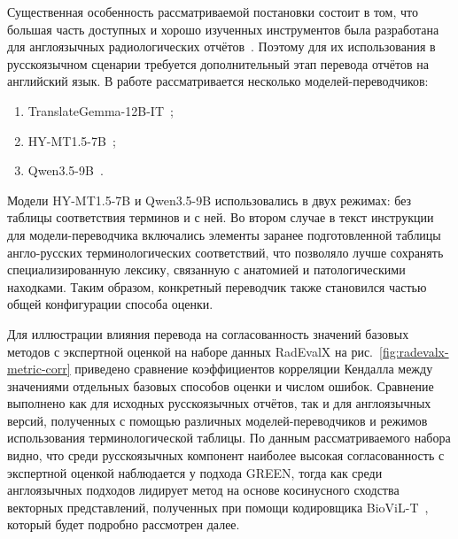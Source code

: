 Существенная особенность рассматриваемой постановки состоит в том, что большая часть доступных и хорошо изученных инструментов была разработана для англоязычных радиологических отчётов~\cite{jain2021radgraph,delbrouck2022semanticrewards,yu2023evaluating,zhao2024ratescore,boecking2022making,bannur2023learning}. Поэтому для их использования в русскоязычном сценарии требуется дополнительный этап перевода отчётов на английский язык. В работе рассматривается несколько моделей-переводчиков:
\begin{enumerate}
    \item TranslateGemma-12B-IT~\cite{translategemma_technical_report};
    \item HY-MT1.5-7B~\cite{hy_mt1_5_technical_report};
    \item Qwen3.5-9B~\cite{qwen3_5_technical_report}.
\end{enumerate}
Модели HY-MT1.5-7B и Qwen3.5-9B использовались в двух режимах: без таблицы соответствия терминов и с ней. Во втором случае в текст инструкции для модели-переводчика включались элементы заранее подготовленной таблицы англо-русских терминологических соответствий, что позволяло лучше сохранять специализированную лексику, связанную с анатомией и патологическими находками. Таким образом, конкретный переводчик также становился частью общей конфигурации способа оценки.

Для иллюстрации влияния перевода на согласованность значений базовых методов с экспертной оценкой на наборе данных RadEvalX на рис.~\ref{fig:radevalx-metric-corr} приведено сравнение коэффициентов корреляции Кендалла между значениями отдельных базовых способов оценки и числом ошибок. Сравнение выполнено как для исходных русскоязычных отчётов, так и для англоязычных версий, полученных с помощью различных моделей-переводчиков и режимов использования терминологической таблицы. По данным рассматриваемого набора видно, что среди русскоязычных компонент наиболее высокая согласованность с экспертной оценкой наблюдается у подхода GREEN, тогда как среди англоязычных подходов лидирует метод на основе косинусного сходства векторных представлений, полученных при помощи кодировщика BioViL-T~\cite{boecking2022making, bannur2023learning}, который будет подробно рассмотрен далее.

